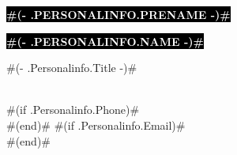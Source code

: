 \documentclass[8pt]{developercv} %
\begin{document}

\begin{minipage}[t]{0.45\textwidth} %
	\vspace{-\baselineskip} %
	
	\colorbox{black}{{\HUGE\textcolor{white}{\textbf{\MakeUppercase{ #(- .Personalinfo.Prename -)# }}}}} %
	
	\colorbox{black}{{\HUGE\textcolor{white}{\textbf{\MakeUppercase{ #(- .Personalinfo.Name -)# }}}}} %
	
	\vspace{6pt}
	
	{\huge { #(- .Personalinfo.Title -)# } } %
\end{minipage}
\begin{minipage}[t]{0.275\textwidth} %
	\vspace{-\baselineskip} %
	
	\\
	#(if .Personalinfo.Phone)#\\#(end)#
	#(if .Personalinfo.Email)#\\#(end)#
\end{minipage}
\end{document}
